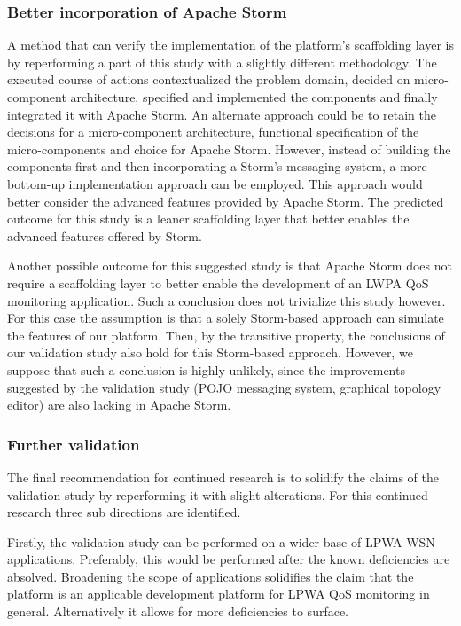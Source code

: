\subsubsection{Better incorporation of Apache Storm}
A method that can verify the implementation of the  platform's scaffolding layer is by reperforming a part of this study with a slightly different methodology. The executed course of actions contextualized the problem domain, decided on micro-component architecture, specified and implemented the components and finally integrated it with Apache Storm. An alternate approach could be to retain the decisions for a micro-component architecture, functional specification of the micro-components and choice for Apache Storm. However, instead of building the components first and then incorporating a Storm's messaging system, a more bottom-up implementation approach can be employed. This approach would better consider the advanced features provided by Apache Storm. The predicted outcome for this study is a leaner scaffolding layer that better enables the advanced features offered by Storm. 

Another possible outcome for this suggested study is that Apache Storm does not require a scaffolding layer to better enable the development of an LWPA QoS monitoring application. Such a conclusion does not trivialize this study however. For this case the assumption is that a solely Storm-based approach can simulate the features of our platform. Then, by the transitive property, the conclusions of our validation study also hold for this Storm-based approach. However, we suppose that such a conclusion is highly unlikely, since the improvements suggested by the validation study (POJO messaging system, graphical topology editor) are also lacking in Apache Storm.

\subsubsection{Further validation}
The final recommendation for continued research is to solidify the claims of the validation study by reperforming it with slight alterations. For this continued research three sub directions are identified. 

Firstly, the validation study can be performed on a wider base of LPWA WSN applications. Preferably, this would be performed after the known deficiencies are absolved. Broadening the scope of applications solidifies the claim that the platform is an applicable development platform for LPWA QoS monitoring in general. Alternatively it allows for more deficiencies to surface.

